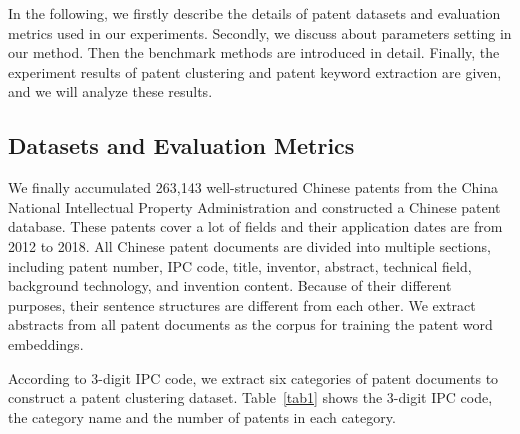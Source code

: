 \documentclass[conference]{IEEEtran}
\begin{document}
\begin{CJK}{UTF8}{gbsn}
	In the following, we firstly describe the details of patent datasets and evaluation metrics used in our experiments. Secondly, we discuss about parameters setting in our method. Then the benchmark methods are introduced in detail. Finally, the experiment results of patent clustering and patent keyword extraction are given, and we will analyze these results.
	\subsection{Datasets and Evaluation Metrics}
	We finally accumulated 263,143 well-structured Chinese patents from the China National Intellectual Property Administration and constructed a Chinese patent database. These patents cover a lot of fields and their application dates are from 2012 to 2018. All Chinese patent documents are divided into multiple sections, including patent number, IPC code, title, inventor, abstract, technical field, background technology, and invention content. Because of their different purposes, their sentence structures are different from each other. We extract abstracts from all patent documents as the corpus for training the patent word embeddings.
	
	According to 3-digit IPC code, we extract six categories of patent documents to construct a patent clustering dataset. Table~\ref{tab1} shows the 3-digit IPC code, the category name and the number of patents in each category.
	

\end{CJK}
\end{document}
